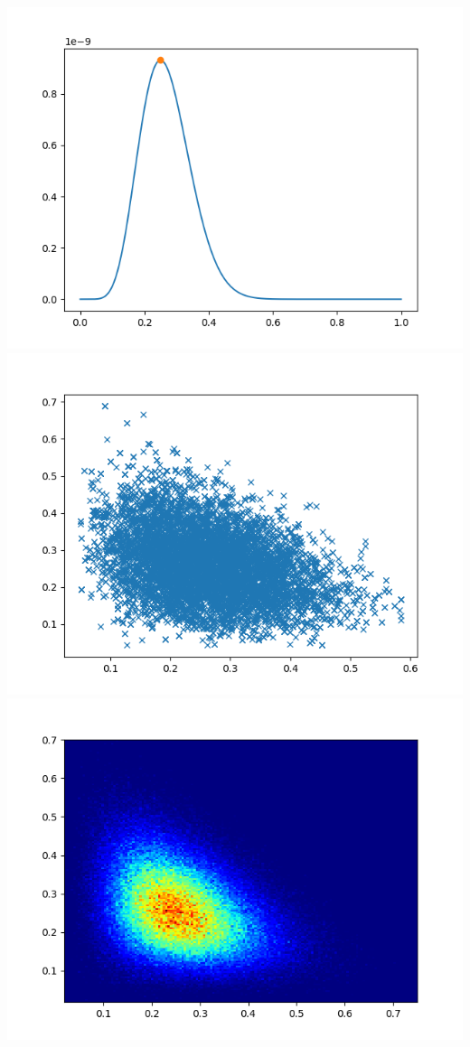 \documentclass[pt12]{article}
\begin{document}
\newpage

\begin{center}
\includegraphics[scale=0.5]{hip23.png}\\
\includegraphics[scale=0.5]{sc23.png}\\
\includegraphics[scale=0.5]{den23.png}\\
\end{center}
\end{document}
